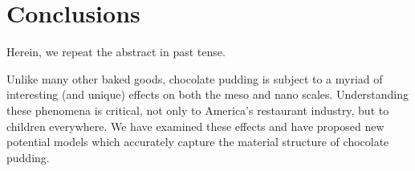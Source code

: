 \documentclass{csri10}
\begin{document}
\section{Conclusions}
Herein, we repeat the abstract in past tense.

Unlike many other baked goods, chocolate pudding is subject to a myriad of interesting (and unique) effects on both the
meso and nano scales.  Understanding these phenomena is critical, not only to America's restaurant industry, but to
children everywhere.  We have examined these effects and have proposed new potential models which accurately capture
the material structure of chocolate pudding.




%
\end{document}
